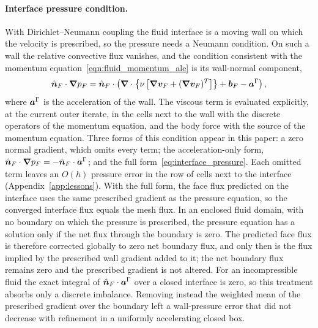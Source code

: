\paragraph{Interface pressure condition.}
With Dirichlet--Neumann coupling the fluid interface is a moving wall on which the velocity is prescribed, so the pressure needs a Neumann condition.
On such a wall the relative convective flux vanishes, and the condition consistent with the momentum equation~\eqref{eqn:fluid_momentum_ale} is its wall-normal component,
\begin{equation}
	\hat{\boldsymbol{n}}_F\cdot\boldsymbol{\nabla} p_F = \hat{\boldsymbol{n}}_F\cdot\left(\boldsymbol{\nabla}\cdot\left\{\nu\left[\boldsymbol{\nabla}\boldsymbol{v}_F + (\boldsymbol{\nabla}\boldsymbol{v}_F)^T\right]\right\} + \boldsymbol{b}_F - \boldsymbol{a}^\Gamma\right),
	\label{eq:interface_pressure}
\end{equation}
where $\boldsymbol{a}^\Gamma$ is the acceleration of the wall.
The viscous term is evaluated explicitly, at the current outer iterate, in the cells next to the wall with the discrete operators of the momentum equation, and the body force with the source of the momentum equation.
Three forms of this condition appear in this paper: a zero normal gradient, which omits every term; the acceleration-only form, $\hat{\boldsymbol{n}}_F\cdot\boldsymbol{\nabla} p_F = -\hat{\boldsymbol{n}}_F\cdot\boldsymbol{a}^\Gamma$; and the full form~\eqref{eq:interface_pressure}.
Each omitted term leaves an $O(h)$ pressure error in the row of cells next to the interface (Appendix~\ref{app:lessons}).
With the full form, the face flux predicted on the interface uses the same prescribed gradient as the pressure equation, so the converged interface flux equals the mesh flux.
In an enclosed fluid domain, with no boundary on which the pressure is prescribed, the pressure equation has a solution only if the net flux through the boundary is zero. The predicted face flux is therefore corrected globally to zero net boundary flux, and only then is the flux implied by the prescribed wall gradient added to it; the net boundary flux remains zero and the prescribed gradient is not altered. For an incompressible fluid the exact integral of $\hat{\boldsymbol{n}}_F\cdot\boldsymbol{a}^\Gamma$ over a closed interface is zero, so this treatment absorbs only a discrete imbalance. Removing instead the weighted mean of the prescribed gradient over the boundary left a wall-pressure error that did not decrease with refinement in a uniformly accelerating closed box.

